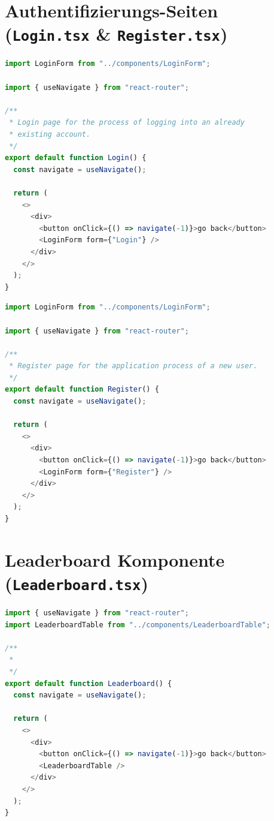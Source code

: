 \documentclass[12pt,a4paper]{article}
\begin{document}
\section{Authentifizierungs-Seiten (\texttt{Login.tsx} \& \texttt{Register.tsx})}
\begin{lstlisting}[language=TypeScript, caption={Login.tsx}]
import LoginForm from "../components/LoginForm";

import { useNavigate } from "react-router";

/**
 * Login page for the process of logging into an already
 * existing account.
 */
export default function Login() {
  const navigate = useNavigate();

  return (
    <>
      <div>
        <button onClick={() => navigate(-1)}>go back</button>
        <LoginForm form={"Login"} />
      </div>
    </>
  );
}
\end{lstlisting}

\begin{lstlisting}[language=TypeScript, caption={Register.tsx}]
import LoginForm from "../components/LoginForm";

import { useNavigate } from "react-router";

/**
 * Register page for the application process of a new user.
 */
export default function Register() {
  const navigate = useNavigate();

  return (
    <>
      <div>
        <button onClick={() => navigate(-1)}>go back</button>
        <LoginForm form={"Register"} />
      </div>
    </>
  );
}
\end{lstlisting}

\section{Leaderboard Komponente (\texttt{Leaderboard.tsx})}
\begin{lstlisting}[language=TypeScript, caption={Leaderboard.tsx}]
import { useNavigate } from "react-router";
import LeaderboardTable from "../components/LeaderboardTable";

/**
 *
 */
export default function Leaderboard() {
  const navigate = useNavigate();

  return (
    <>
      <div>
        <button onClick={() => navigate(-1)}>go back</button>
        <LeaderboardTable />
      </div>
    </>
  );
}
\end{lstlisting}
\end{document}
